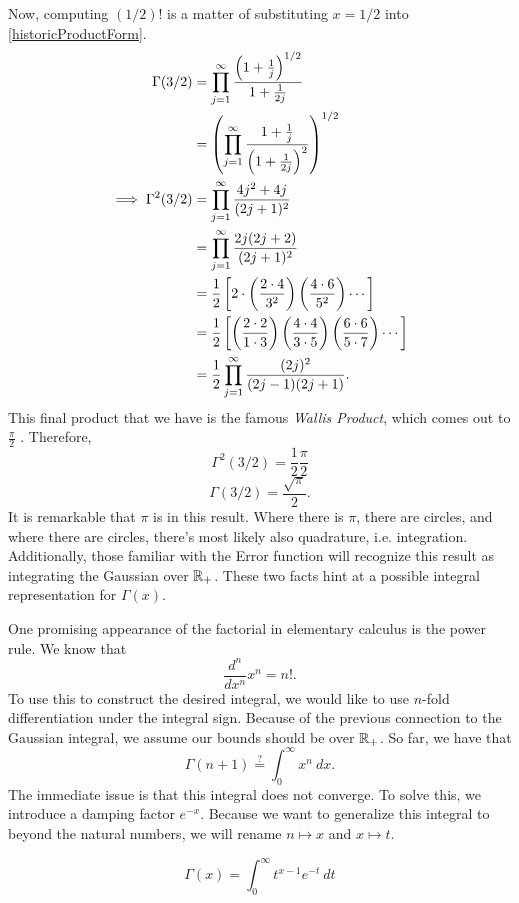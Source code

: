 Now, computing $(1/2)!$ is a matter of substituting $x=1/2$ into \eqref{historicProductForm}.
\begin{align*}
\Gamma(3/2) &= \prod_{j=1}^\infty \frac{\left(1 + \frac{1}{j}\right)^{1/2}}{1 + \frac{1}{2j}} \\
&= \left(\prod_{j=1}^\infty \frac{1 + \frac{1}{j}}{\left(1 + \frac{1}{2j}\right)^2}\right)^{1/2} \\
\implies \Gamma^2 (3/2) &= \prod_{j=1}^\infty \frac{4j^2 + 4j}{(2j+1)^2} \\
&= \prod_{j=1}^\infty \frac{2j(2j+2)}{(2j+1)^2} \\
&= \frac{1}{2} \left[ 2 \cdot \left(\frac{2\cdot4}{3^2}\right) \left(\frac{4\cdot6}{5^2}\right) \cdots \right] \\
&= \frac{1}{2} \left[ \left(\frac{2\cdot2}{1\cdot3}\right) \left(\frac{4\cdot4}{3\cdot5}\right) \left(\frac{6\cdot6}{5\cdot7}\right) \cdots \right] \\
&= \frac{1}{2} \prod_{j=1}^\infty \frac{(2j)^2}{(2j-1)(2j+1)}.
\end{align*}
This final product that we have is the famous \textit{Wallis Product}, which comes out to $\frac{\pi}{2}$ \cite{WallisProduct}.
Therefore,
$$\Gamma^2 (3/2) = \frac{1}{2} \frac{\pi}{2}$$
\begin{equation}\label{gammaGaussian}
\boxed{\Gamma (3/2) = \frac{\sqrt{\pi}}{2}}.
\end{equation}
It is remarkable that $\pi$ is in this result. 
Where there is $\pi$, there are circles, and where there are circles, there's most likely also quadrature, i.e. integration.
Additionally, those familiar with the Error function will recognize this result as integrating the Gaussian over $\mathbb{R}_+$.
These two facts hint at a possible integral representation for $\Gamma(x)$.

One promising appearance of the factorial in elementary calculus is the power rule.
We know that
$$\frac{d^n}{dx^n} x^n = n!.$$
To use this to construct the desired integral, we would like to use $n$-fold differentiation under the integral sign.
Because of the previous connection to the Gaussian integral, we assume our bounds should be over $\mathbb{R}_+$. 
So far, we have that
$$\Gamma(n+1) \stackrel{?}{=} \int_{0}^\infty x^n \ dx.$$
The immediate issue is that this integral does not converge.
To solve this, we introduce a damping factor $e^{-x}$.
Because we want to generalize this integral to beyond the natural numbers, we will rename $n \mapsto x$ and $x \mapsto t$.

\begin{equation}\label{intForm}
\boxed{\Gamma(x) = \int_{0}^\infty t^{x-1} e^{-t} \ dt}
\end{equation}

